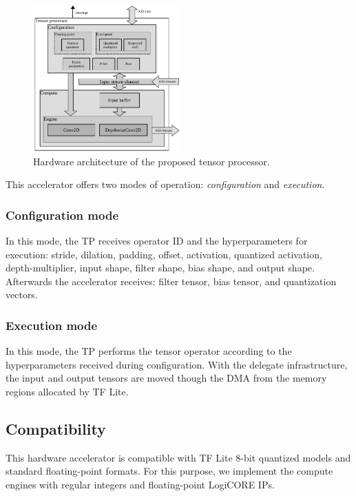 \begin{figure}[t!]
	\centering
	\includegraphics[width=0.5\textwidth]{../figures/accelerator.pdf}
	\caption{Hardware architecture of the proposed tensor processor.}
	\label{fig:accelerator}
\end{figure}

This accelerator offers two modes of operation: \emph{configuration} and \emph{execution}.

\subsubsection{Configuration mode}
In this mode, the TP receives operator ID and the hyperparameters for execution: stride, dilation, padding, offset, activation, quantized activation, depth-multiplier, input shape, filter shape, bias shape, and output shape. Afterwards the accelerator receives: filter tensor, bias tensor, and quantization vectors.

\subsubsection{Execution mode}
In this mode, the TP performs the tensor operator according to the hyperparameters received during configuration. With the delegate infrastructure, the input and output tensors are moved though the DMA from the memory regions allocated by TF Lite.

\subsection{Compatibility}

 This hardware accelerator is compatible with TF Lite 8-bit quantized models and standard floating-point formats. For this purpose, we implement the compute engines with regular integers and floating-point LogiCORE IPs.
 
